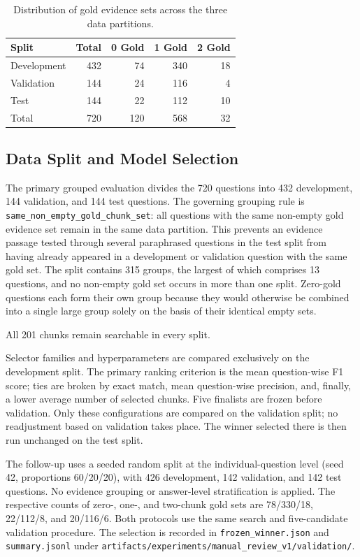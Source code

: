 \documentclass[11pt]{article}
\begin{document}
\begin{table}[t]
\centering
\small
\begin{tabular}{lrrrr}
\toprule
\textbf{Split} & \textbf{Total} & \textbf{0 Gold} & \textbf{1 Gold} & \textbf{2 Gold} \\
\midrule
Development & 432 & 74 & 340 & 18 \\
Validation & 144 & 24 & 116 & 4 \\
Test         & 144 & 22 & 112 & 10 \\
\midrule
Total       & 720 & 120 & 568 & 32 \\
\bottomrule
\end{tabular}
\caption{Distribution of gold evidence sets across the three data partitions.}
\label{tab:gold-distribution}
\end{table}

\subsection{Data Split and Model Selection}
\label{sec:protocols}

The primary grouped evaluation divides the 720 questions into 432 development, 144 validation, and 144 test questions. The governing grouping rule is \texttt{same\_non\_empty\_gold\_chunk\_set}: all questions with the same non-empty gold evidence set remain in the same data partition. This prevents an evidence passage tested through several paraphrased questions in the test split from having already appeared in a development or validation question with the same gold set. The split contains 315 groups, the largest of which comprises 13 questions, and no non-empty gold set occurs in more than one split. Zero-gold questions each form their own group because they would otherwise be combined into a single large group solely on the basis of their identical empty sets.

All 201 chunks remain searchable in every split.

Selector families and hyperparameters are compared exclusively on the development split. The primary ranking criterion is the mean question-wise F1 score; ties are broken by exact match, mean question-wise precision, and, finally, a lower average number of selected chunks. Five finalists are frozen before validation. Only these configurations are compared on the validation split; no readjustment based on validation takes place. The winner selected there is then run unchanged on the test split.

The follow-up uses a seeded random split at the individual-question level (seed 42, proportions 60/20/20), with 426 development, 142 validation, and 142 test questions. No evidence grouping or answer-level stratification is applied. The respective counts of zero-, one-, and two-chunk gold sets are 78/330/18, 22/112/8, and 20/116/6. Both protocols use the same search and five-candidate validation procedure. The selection is recorded in \nolinkurl{frozen_winner.json} and \nolinkurl{summary.jsonl} under \nolinkurl{artifacts/experiments/manual_review_v1/validation/}.
\end{document}

